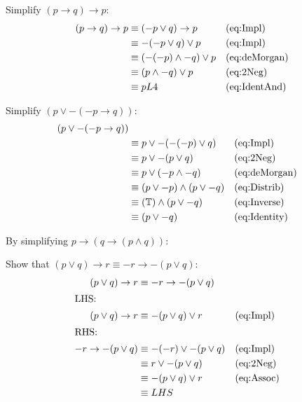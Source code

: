 Simplify $(p \to q) \to p$:
\begin{align}
 (p \to q) \to p
   & \equiv (-p \lor q) \to p       && \text{(eq:Impl)}\\
   & \equiv -(-p \lor q) \lor p     && \text{(eq:Impl)}\\
   & \equiv (-(-p) \land -q) \lor p && \text{(eq:deMorgan)}\\
   & \equiv (p \land -q) \lor p     && \text{(eq:2Neg)}\\
   & \equiv p L4                    && \text{(eq:IdentAnd)}
\end{align}

Simplify $(p \lor -(-p \to q))$:
\begin{align}
  (p \lor -(-p \to q)) & \\
       & \equiv p \lor -(-(-p) \lor q)         && \text{(eq:Impl)}\\
       & \equiv p \lor -(p \lor q)             && \text{(eq:2Neg)}\\
       & \equiv p \lor (-p \land -q)           && \text{(eq:deMorgan)}\\
       & \equiv (p \lor -p) \land (p \lor -q)  && \text{(eq:Distrib)}\\
       & \equiv (\mathbb{T}) \land (p \lor -q) && \text{(eq:Inverse)}\\
       & \equiv (p \lor -q)                     && \text{(eq:Identity)}
\end{align}

By simplifying $p \to (q \to (p \land q)) $:

Show that $(p \lor q) \to r \equiv -r \to -(p \lor q)$:
\begin{align}
  (p \lor q) \to r & \equiv -r \to -(p \lor q) \\
  \intertext{LHS:}
  (p \lor q) \to r & \equiv - (p \lor q) \lor r      && \text{(eq:Impl)}\\
  \intertext{RHS:}
  -r \to -(p \lor q) & \equiv -(-r) \lor -(p \lor q) && \text{(eq:Impl)}\\
    & \equiv r \lor -(p \lor q)                      && \text{(eq:2Neg)}\\
    & \equiv -(p \lor q) \lor r                      && \text{(eq:Assoc)}\\
    & \equiv LHS  
\end{align}


